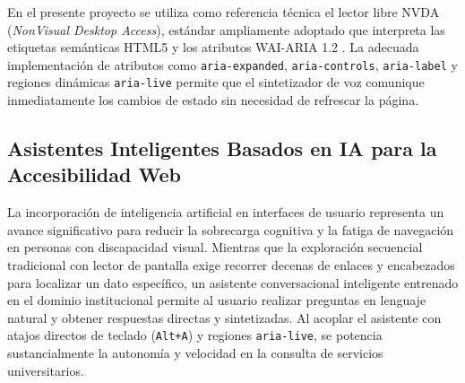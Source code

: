 En el presente proyecto se utiliza como referencia técnica el lector libre NVDA (\textit{NonVisual Desktop Access}), estándar ampliamente adoptado que interpreta las etiquetas semánticas HTML5 y los atributos WAI-ARIA 1.2 \cite{wai_aria12}. La adecuada implementación de atributos como \texttt{aria-expanded}, \texttt{aria-controls}, \texttt{aria-label} y regiones dinámicas \texttt{aria-live} permite que el sintetizador de voz comunique inmediatamente los cambios de estado sin necesidad de refrescar la página.

\subsection{Asistentes Inteligentes Basados en IA para la Accesibilidad Web}
La incorporación de inteligencia artificial en interfaces de usuario representa un avance significativo para reducir la sobrecarga cognitiva y la fatiga de navegación en personas con discapacidad visual. Mientras que la exploración secuencial tradicional con lector de pantalla exige recorrer decenas de enlaces y encabezados para localizar un dato específico, un asistente conversacional inteligente entrenado en el dominio institucional permite al usuario realizar preguntas en lenguaje natural y obtener respuestas directas y sintetizadas. Al acoplar el asistente con atajos directos de teclado (\texttt{Alt+A}) y regiones \texttt{aria-live}, se potencia sustancialmente la autonomía y velocidad en la consulta de servicios universitarios.
